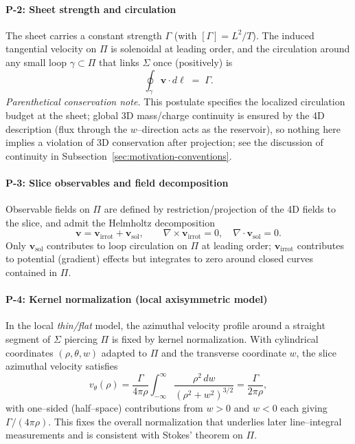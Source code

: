 \paragraph{P-2: Sheet strength and circulation}
\label{post:P2}
The sheet carries a constant strength $\Gamma$ (with $[\Gamma]=L^2/T$). The induced tangential velocity on $\Pi$ is solenoidal at leading order, and the circulation around any small loop $\gamma\subset\Pi$ that links $\Sigma$ once (positively) is
\[
\oint_{\gamma}\mathbf{v}\cdot d\boldsymbol{\ell}\;=\;\Gamma.
\]
\emph{Parenthetical conservation note.} This postulate specifies the localized circulation budget at the sheet; global 3D mass/charge continuity is ensured by the 4D description (flux through the $w$–direction acts as the reservoir), so nothing here implies a violation of 3D conservation after projection; see the discussion of continuity in Subsection~\ref{sec:motivation-conventions}.

\paragraph{P-3: Slice observables and field decomposition}
\label{post:P3}
Observable fields on $\Pi$ are defined by restriction/projection of the 4D fields to the slice, and admit the Helmholtz decomposition
\[
\mathbf{v}=\mathbf{v}_{\mathrm{irrot}}+\mathbf{v}_{\mathrm{sol}},\qquad
\nabla\times \mathbf{v}_{\mathrm{irrot}}=0,\quad
\nabla\cdot \mathbf{v}_{\mathrm{sol}}=0.
\]
Only $\mathbf{v}_{\mathrm{sol}}$ contributes to loop circulation on $\Pi$ at leading order; $\mathbf{v}_{\mathrm{irrot}}$ contributes to potential (gradient) effects but integrates to zero around closed curves contained in $\Pi$.

\paragraph{P-4: Kernel normalization (local axisymmetric model)}
\label{post:P4}
In the local \emph{thin/flat} model, the azimuthal velocity profile around a straight segment of $\Sigma$ piercing $\Pi$ is fixed by kernel normalization. With cylindrical coordinates $(\rho,\theta,w)$ adapted to $\Pi$ and the transverse coordinate $w$, the slice azimuthal velocity satisfies
\[
v_\theta(\rho)
=\frac{\Gamma}{4\pi\rho}\!\int_{-\infty}^{\infty}\frac{\rho^2\,dw}{(\rho^2+w^2)^{3/2}}
=\frac{\Gamma}{2\pi\rho},
\]
with one–sided (half–space) contributions from $w>0$ and $w<0$ each giving $\Gamma/(4\pi\rho)$. This fixes the overall normalization that underlies later line–integral measurements and is consistent with Stokes' theorem on $\Pi$.

